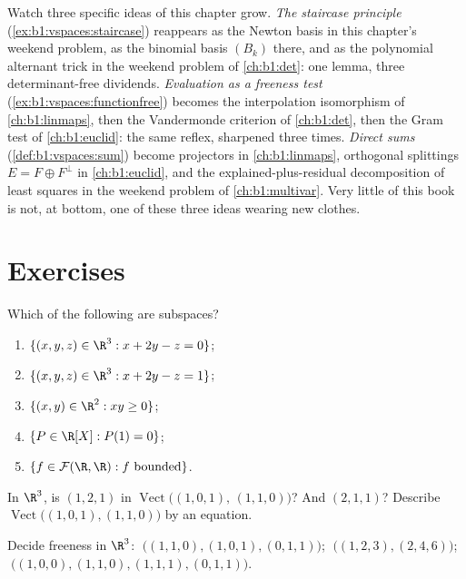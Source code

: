 \begin{remark}
\label{rem:b1:vspaces:threads}
Watch three specific ideas of this chapter grow.
\emph{The staircase principle}
(\cref{ex:b1:vspaces:staircase}) reappears as the Newton basis
in this chapter's weekend problem, as the binomial basis
$(B_k)$ there, and as the polynomial alternant trick in the
weekend problem of \cref{ch:b1:det}: one lemma, three
determinant-free dividends.
\emph{Evaluation as a freeness test}
(\cref{ex:b1:vspaces:functionfree}) becomes the interpolation
isomorphism of \cref{ch:b1:linmaps}, then the Vandermonde
criterion of \cref{ch:b1:det}, then the Gram test of
\cref{ch:b1:euclid}: the same reflex, sharpened three times.
\emph{Direct sums} (\cref{def:b1:vspaces:sum}) become
projectors in \cref{ch:b1:linmaps}, orthogonal splittings $E =
F \oplus F^\perp$ in \cref{ch:b1:euclid}, and the
explained-plus-residual decomposition of least squares in the
weekend problem of \cref{ch:b1:multivar}. Very little of this
book is not, at bottom, one of these three ideas wearing new
clothes.
\end{remark}

\section{Exercises}

\begin{exercise}[$\star$]\label{exo:b1:vspaces:1}
Which of the following are subspaces?
\begin{enumerate}
  \item $\{(x, y, z) \in \R^3 : x + 2y - z = 0\}$;
  \item $\{(x, y, z) \in \R^3 : x + 2y - z = 1\}$;
  \item $\{(x, y) \in \R^2 : xy \geq 0\}$;
  \item $\{P \in \R[X] : P(1) = 0\}$;
  \item $\{f \in \mathcal{F}(\R,\R) : f \text{ bounded}\}$.
\end{enumerate}
\end{exercise}

\begin{exercise}[$\star$]\label{exo:b1:vspaces:2}
In $\R^3$, is $(1, 2, 1)$ in
$\operatorname{Vect}\bigl((1,0,1),\, (1,1,0)\bigr)$? And $(2, 1,
1)$? Describe $\operatorname{Vect}\bigl((1,0,1),(1,1,0)\bigr)$ by an
equation.
\end{exercise}

\begin{exercise}[$\star$]\label{exo:b1:vspaces:3}
Decide freeness in $\R^3$: $\;\bigl((1,1,0), (1,0,1),
(0,1,1)\bigr)$; $\;\bigl((1,2,3), (2,4,6)\bigr)$;
$\;\bigl((1,0,0), (1,1,0), (1,1,1), (0,1,1)\bigr)$.
\end{exercise}

